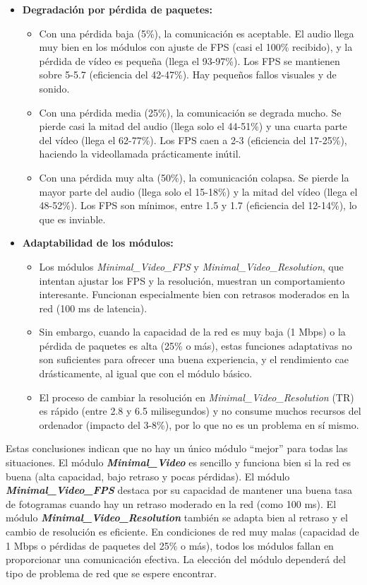 \begin{itemize}
\item \textbf{Degradación por pérdida de paquetes:}
\begin{itemize}
    \item Con una pérdida baja (5\%), la comunicación es aceptable. El audio llega muy bien en los módulos con ajuste de FPS (casi el 100\% recibido), y la pérdida de vídeo es pequeña (llega el 93-97\%). Los FPS se mantienen sobre 5-5.7 (eficiencia del 42-47\%). Hay pequeños fallos visuales y de sonido.
    \item Con una pérdida media (25\%), la comunicación se degrada mucho. Se pierde casi la mitad del audio (llega solo el 44-51\%) y una cuarta parte del vídeo (llega el 62-77\%). Los FPS caen a 2-3 (eficiencia del 17-25\%), haciendo la videollamada prácticamente inútil.
    \item Con una pérdida muy alta (50\%), la comunicación colapsa. Se pierde la mayor parte del audio (llega solo el 15-18\%) y la mitad del vídeo (llega el 48-52\%). Los FPS son mínimos, entre 1.5 y 1.7 (eficiencia del 12-14\%), lo que es inviable.
\end{itemize}

\item \textbf{Adaptabilidad de los módulos:}
\begin{itemize}
    \item Los módulos \textit{Minimal\_Video\_FPS} y \textit{Minimal\_Video\_Resolution}, que intentan ajustar los FPS y la resolución, muestran un comportamiento interesante. Funcionan especialmente bien con retrasos moderados en la red (100 ms de latencia).
    \item Sin embargo, cuando la capacidad de la red es muy baja (1 Mbps) o la pérdida de paquetes es alta (25\% o más), estas funciones adaptativas no son suficientes para ofrecer una buena experiencia, y el rendimiento cae drásticamente, al igual que con el módulo básico.
    \item El proceso de cambiar la resolución en \textit{Minimal\_Video\_Resolution} (TR) es rápido (entre 2.8 y 6.5 milisegundos) y no consume muchos recursos del ordenador (impacto del 3-8\%), por lo que no es un problema en sí mismo.
\end{itemize}
\end{itemize}

Estas conclusiones indican que no hay un único módulo ``mejor'' para todas las situaciones.
El módulo \textbf{\textit{Minimal\_Video}} es sencillo y funciona bien si la red es buena (alta capacidad, bajo retraso y pocas pérdidas).
El módulo \textbf{\textit{Minimal\_Video\_FPS}} destaca por su capacidad de mantener una buena tasa de fotogramas cuando hay un retraso moderado en la red (como 100 ms).
El módulo \textbf{\textit{Minimal\_Video\_Resolution}} también se adapta bien al retraso y el cambio de resolución es eficiente.
En condiciones de red muy malas (capacidad de 1 Mbps o pérdidas de paquetes del 25\% o más), todos los módulos fallan en proporcionar una comunicación efectiva. La elección del módulo dependerá del tipo de problema de red que se espere encontrar.


